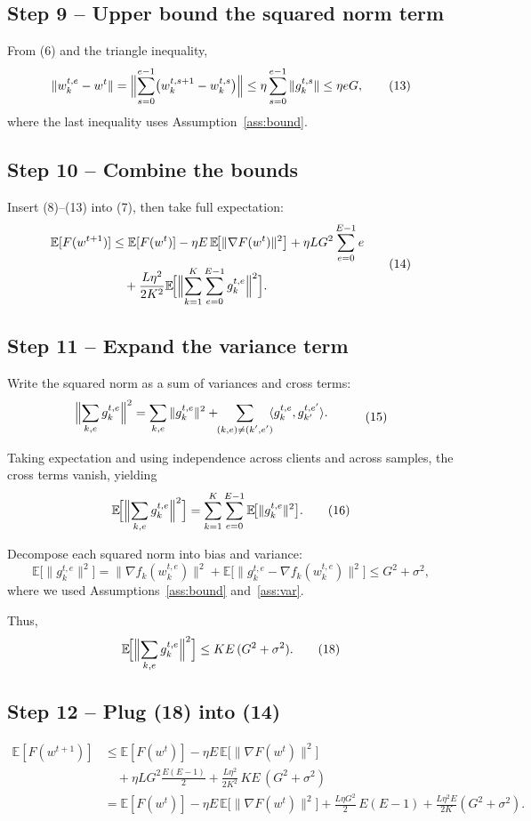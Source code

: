 \documentclass[11pt]{article}
\newcommand{\E}{\mathbb{E}}
\begin{document}
\subsection*{Step 9 – Upper bound the squared norm term}
From (6) and the triangle inequality,
\[
\|w_{k}^{t,e}-w^{t}\|
= \Bigl\|\sum_{s=0}^{e-1}\bigl(w_{k}^{t,s+1}-w_{k}^{t,s}\bigr)\Bigr\|
\le \eta\sum_{s=0}^{e-1}\|g_{k}^{t,s}\|
\le \eta e G,
\tag{13}
\]
where the last inequality uses Assumption~\ref{ass:bound}.

\subsection*{Step 10 – Combine the bounds}
Insert (8)–(13) into (7), then take full expectation:
\[
\begin{aligned}
\E[F(w^{t+1})]
&\le \E[F(w^{t})]
-\eta E\,\E\!\bigl[\|\nabla F(w^{t})\|^{2}\bigr]
+ \eta L G^{2}\sum_{e=0}^{E-1}e\\
&\quad +\frac{L\eta^{2}}{2K^{2}}
\E\!\Bigl[\Bigl\|\sum_{k=1}^{K}\sum_{e=0}^{E-1} g_{k}^{t,e}\Bigr\|^{2}\Bigr].
\end{aligned}
\tag{14}
\]

\subsection*{Step 11 – Expand the variance term}
Write the squared norm as a sum of variances and cross terms:
\[
\begin{aligned}
\Bigl\|\sum_{k,e} g_{k}^{t,e}\Bigr\|^{2}
&= \sum_{k,e}\|g_{k}^{t,e}\|^{2}
   +\!\!\sum_{\substack{(k,e)\neq(k',e')}}\!\!\langle g_{k}^{t,e},g_{k'}^{t,e'}\rangle .
\end{aligned}
\tag{15}
\]

Taking expectation and using independence across clients and across
samples, the cross terms vanish, yielding
\[
\E\!\Bigl[\Bigl\|\sum_{k,e} g_{k}^{t,e}\Bigr\|^{2}\Bigr]
= \sum_{k=1}^{K}\sum_{e=0}^{E-1}
\E\!\bigl[\|g_{k}^{t,e}\|^{2}\bigr].
\tag{16}
\]

Decompose each squared norm into bias and variance:
\[
\E\!\bigl[\|g_{k}^{t,e}\|^{2}\bigr]
= \|\nabla f_k(w_{k}^{t,e})\|^{2}
  +\E\!\bigl[\|g_{k}^{t,e}-\nabla f_k(w_{k}^{t,e})\|^{2}\bigr]
\le G^{2}+\sigma^{2},
\tag{17}
\]
where we used Assumptions~\ref{ass:bound} and~\ref{ass:var}.

Thus,
\[
\E\!\Bigl[\Bigl\|\sum_{k,e} g_{k}^{t,e}\Bigr\|^{2}\Bigr]
\le K E\,(G^{2}+\sigma^{2}).
\tag{18}
\]

\subsection*{Step 12 – Plug (18) into (14)}
\[
\begin{aligned}
\E[F(w^{t+1})]
&\le \E[F(w^{t})]
-\eta E\,\E\!\bigl[\|\nabla F(w^{t})\|^{2}\bigr] \\
&\quad + \eta L G^{2}\frac{E(E-1)}{2}
+\frac{L\eta^{2}}{2K^{2}}\,K E\,(G^{2}+\sigma^{2})\\[4pt]
&= \E[F(w^{t})]
-\eta E\,\E\!\bigl[\|\nabla F(w^{t})\|^{2}\bigr]
+\frac{L\eta G^{2}}{2}\,E(E-1)
+\frac{L\eta^{2}E}{2K}(G^{2}+\sigma^{2}).
\end{aligned}
\tag{19}
\]
\end{document}
